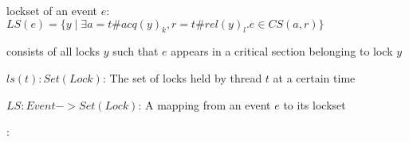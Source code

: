 \documentclass[landscape, a4paper]{article}
\begin{document}
\begin{minipage}[t]{0.2\linewidth}
\begin{betterlist}
\begin{betterlist}
\begin{betterlist}
			\end{betterlist}
			\item \alert{lockset of an event $e$:} $LS(e) = \{y \mid \exists a = t\#acq(y)_k, r = t\#rel(y)_l .e \in CS(a, r)\}$
			\begin{betterlist}
				\item consists of all locks $y$ such that $e$ appears in a critical section belonging to lock $y$
			\end{betterlist}
			\item {}
			\begin{betterlist}
				\item $ls(t): Set(Lock)$: The set of locks held by thread $t$ at a certain time
				\item $LS : Event -> Set(Lock)$: A mapping from an event $e$ to its lockset
			\end{betterlist}
			\item {}:


\end{betterlist}
\end{betterlist}
\end{minipage}
\end{document}
